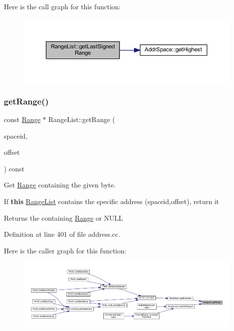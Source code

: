 Here is the call graph for this function\+:
\nopagebreak
\begin{figure}[H]
\begin{center}
\leavevmode
\includegraphics[width=350pt]{class_range_list_af9a80345a7c9f95568c00f6f1dbe2673_cgraph}
\end{center}
\end{figure}
\mbox{\label{class_range_list_aa085a8e737c45ede0bf239e964901802}} 
\subsubsection{\texorpdfstring{getRange()}{getRange()}}
{\footnotesize\ttfamily const \mbox{\hyperlink{class_range}{Range}} $\ast$ Range\+List\+::get\+Range (\begin{DoxyParamCaption}\item[{\mbox{\hyperlink{class_addr_space}{Addr\+Space}} $\ast$}]{spaceid,  }\item[{\mbox{\hyperlink{types_8h_a2db313c5d32a12b01d26ac9b3bca178f}{uintb}}}]{offset }\end{DoxyParamCaption}) const}



Get \mbox{\hyperlink{class_range}{Range}} containing the given byte. 

If {\bfseries{this}} \mbox{\hyperlink{class_range_list}{Range\+List}} contains the specific address (spaceid,offset), return it \begin{DoxyReturn}{Returns}
the containing \mbox{\hyperlink{class_range}{Range}} or N\+U\+LL 
\end{DoxyReturn}


Definition at line 401 of file address.\+cc.

Here is the caller graph for this function\+:
\nopagebreak
\begin{figure}[H]
\begin{center}
\leavevmode
\includegraphics[width=350pt]{class_range_list_aa085a8e737c45ede0bf239e964901802_icgraph}
\end{center}
\end{figure}
\mbox{\label{class_range_list_a61b4034c6930b45dd8d365c382c73b86}} 
